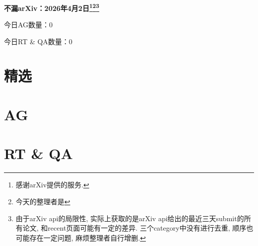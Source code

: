 \documentclass[9pt, a4paper]{article}
\theoremstyle{plain}
\theoremstyle{definition}
\theoremstyle{remark}
\newcommand{\AGnumber}{0}
\newcommand{\RTQAnumber}{0}
\newcommand{\NewestDate}{2026年4月2日}
\newcommand{\todayarXiver}{} %
\begin{document}
\begin{center}
    \Huge\textbf{不漏arXiv：\NewestDate\footnote{感谢arXiv提供的服务.}\footnote{今天的整理者是\todayarXiver}\footnote{由于arXiv api的局限性, 实际上获取的是arXiv api给出的最近三天submit的所有论文, 和recent页面可能有一定的差异. 三个category中没有进行去重, 顺序也可能存在一定问题, 麻烦整理者自行增删.}} \\
\end{center}

\setcounter{section}{-1}

\begin{center}
    今日AG数量：\AGnumber
    
    今日RT \& QA数量：\RTQAnumber
    
\end{center}


\section{精选}


\section{AG}

\section{RT \& QA}
\end{document}
